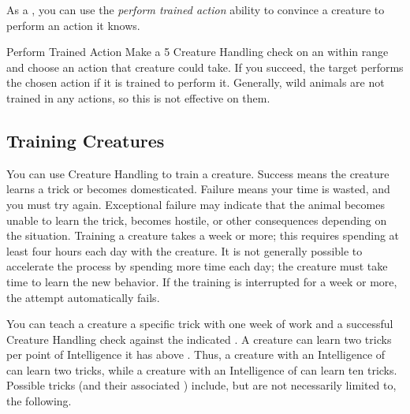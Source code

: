         As a , you can use the \textit{perform trained action} ability to convince a creature to perform an action it knows.

        \begin{freeability}{Perform Trained Action}
            Make a  5 Creature Handling check on an  within \rnglong range and choose an action that creature could take.
            If you succeed, the target performs the chosen action if it is trained to perform it.
            Generally, wild animals are not trained in any actions, so this is not effective on them.
        \end{freeability}

    \subsection{Training Creatures}\label{Training Creatures}
        You can use Creature Handling to train a creature. Success means the creature learns a trick or becomes domesticated. Failure means your time is wasted, and you must try again. Exceptional failure may indicate that the animal becomes unable to learn the trick, becomes hostile, or other consequences depending on the situation. Training a creature takes a week or more; this requires spending at least four hours each day with the creature. It is not generally possible to accelerate the process by spending more time each day; the creature must take time to learn the new behavior. If the training is interrupted for a week or more, the attempt automatically fails.

         You can teach a creature a specific trick with one week of work and a successful Creature Handling check against the indicated . A creature can learn two tricks per point of Intelligence it has above . Thus, a creature with an Intelligence of  can learn two tricks, while a creature with an Intelligence of  can learn ten tricks. Possible tricks (and their associated ) include, but are not necessarily limited to, the following.

